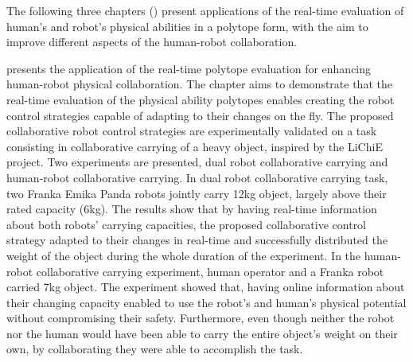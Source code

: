 
The following three chapters () present applications of the real-time evaluation of human's and robot's physical abilities in a polytope form, with the aim to improve different aspects of the human-robot collaboration.


 presents the application of the real-time polytope evaluation for enhancing human-robot physical collaboration. The chapter aims to demonstrate that the real-time evaluation of the physical ability polytopes enables creating the robot control strategies capable of adapting to their changes on the fly. The proposed collaborative robot control strategies are experimentally validated on a task consisting in collaborative carrying of a heavy object, inspired by the LiChiE project. Two experiments are presented, dual robot collaborative carrying and human-robot collaborative carrying. In dual robot collaborative carrying task, two Franka Emika Panda robots jointly carry 12kg object, largely above their rated capacity (6kg). The results show that by having real-time information about both robots' carrying capacities, the proposed collaborative control strategy adapted to their changes in real-time and successfully distributed the weight of the object during the whole duration of the experiment. In the human-robot collaborative carrying experiment, human operator and a Franka robot carried 7kg object. The experiment showed that, having online information about their changing capacity enabled to use the robot's and human's physical potential without compromising their safety. Furthermore, even though neither the robot nor the human would have been able to carry the entire object's weight on their own, by collaborating they were able to accomplish the task.


